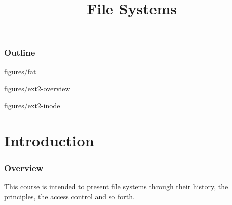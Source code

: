%
%
%
%
%
%

%
%

%
%

\def\path{../../..}

%
%



%
%

\title{File Systems}

%
%



%
%

\begin{frame}
  \titlepage
\end{frame}

%
%

\begin{frame}
  \frametitle{Outline}

  \tableofcontents
\end{frame}

%
%

                {figures/fat}

                {figures/ext2-overview}

                {figures/ext2-inode}

%
%

%
%

\section{Introduction}


\begin{frame}
  \frametitle{Overview}

  This course is intended to present file systems through their history,
  the principles, the access control and so forth.
\end{frame}

